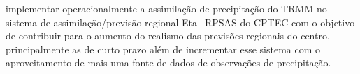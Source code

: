 \begin{resumo}
implementar operacionalmente a assimilação de precipitação do TRMM no sistema de assimilação/previsão regional Eta+RPSAS do CPTEC com o objetivo de contribuir para o aumento do realismo das previsões regionais do centro, principalmente as de curto prazo além de incrementar esse sistema com o aproveitamento de mais uma fonte de dados de observações de precipitação.

\end{resumo}